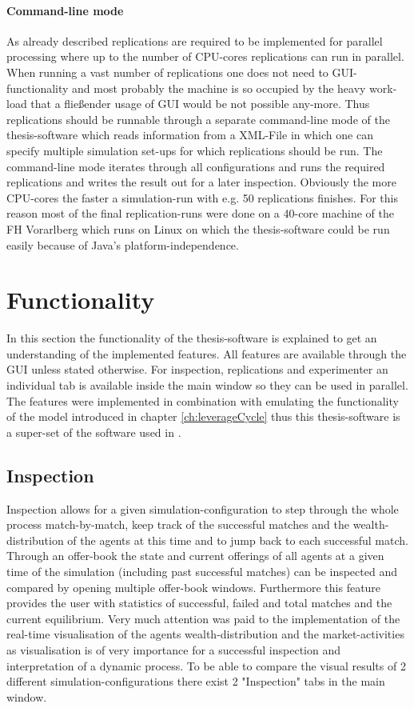 \documentclass[Bachelorarbeit.tex]{subfiles}
\begin{document}
\paragraph{Command-line mode}
As already described replications are required to be implemented for parallel processing where up to the number of CPU-cores replications can run in parallel. When running a vast number of replications one does not need to GUI-functionality and most probably the machine is so occupied by the heavy work-load that a fließender usage of GUI would be not possible any-more. Thus replications should be runnable through a separate command-line mode of the thesis-software which reads information from a XML-File in which one can specify multiple simulation set-ups for which replications should be run. The command-line mode iterates through all configurations and runs the required replications and writes the result out for a later inspection. Obviously the more CPU-cores the faster a simulation-run with e.g. 50 replications finishes. For this reason most of the final replication-runs were done on a 40-core machine of the FH Vorarlberg which runs on Linux on which the thesis-software could be run easily because of Java's platform-independence.

\section{Functionality}
In this section the functionality of the thesis-software is explained to get an understanding of the implemented features. All features are available through the GUI unless stated otherwise. For inspection, replications and experimenter an individual tab is available inside the main window so they can be used in parallel. The features were implemented in combination with emulating the functionality of the model introduced in chapter \ref{ch:leverageCycle} thus this thesis-software is a super-set of the software used in \cite{Breuer2015}.

\subsection{Inspection}
Inspection allows for a given simulation-configuration to step through the whole process match-by-match, keep track of the successful matches and the wealth-distribution of the agents at this time and to jump back to each successful match. Through an offer-book the state and current offerings of all agents at a given time of the simulation (including past successful matches) can be inspected and compared by opening multiple offer-book windows. Furthermore this feature provides the user with statistics of successful, failed and total matches and the current equilibrium. Very much attention was paid to the implementation of the real-time visualisation of the agents wealth-distribution and the market-activities as visualisation is of very importance for a successful inspection and interpretation of a dynamic process. To be able to compare the visual results of 2 different simulation-configurations there exist 2 "Inspection" tabs in the main window.
\end{document}
